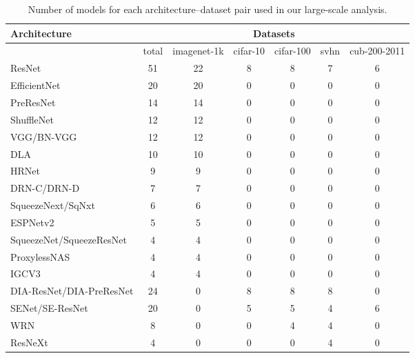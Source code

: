 
\begin{table}[t]
\small
\begin{center}
\begin{tabular}{|l|c|c|c|c|c|c|}
\hline
Architecture & \multicolumn{6}{|c|}{ Datasets } \\
\hline
  & total &imagenet-1k & cifar-10 & cifar-100 & svhn & cub-200-2011 \\
\hline
ResNet & 51 &22 & 8 & 8 & 7 & 6 \\
EfficientNet & 20 &20 & 0 & 0 & 0 & 0 \\
PreResNet & 14 &14 & 0 & 0 & 0 & 0 \\
ShuffleNet & 12 &12 & 0 & 0 & 0 & 0 \\
VGG/BN-VGG & 12 &12 & 0 & 0 & 0 & 0 \\
DLA & 10 &10 & 0 & 0 & 0 & 0 \\
HRNet & 9 &9 & 0 & 0 & 0 & 0 \\
DRN-C/DRN-D & 7 &7 & 0 & 0 & 0 & 0 \\
SqueezeNext/SqNxt & 6 &6 & 0 & 0 & 0 & 0 \\
ESPNetv2 & 5 &5 & 0 & 0 & 0 & 0 \\
SqueezeNet/SqueezeResNet & 4 &4 & 0 & 0 & 0 & 0 \\
ProxylessNAS & 4 &4 & 0 & 0 & 0 & 0 \\
IGCV3 & 4 &4 & 0 & 0 & 0 & 0 \\
DIA-ResNet/DIA-PreResNet & 24 &0 & 8 & 8 & 8 & 0 \\
SENet/SE-ResNet & 20 &0 & 5 & 5 & 4 & 6 \\
WRN & 8 &0 & 0 & 4 & 4 & 0 \\
ResNeXt & 4 &0 & 0 & 0 & 4 & 0 \\

\hline
\end{tabular}
\end{center}
\caption{Number of models for each architecture--dataset pair used in our large-scale analysis.}
\label{table:architectures}
\end{table}

